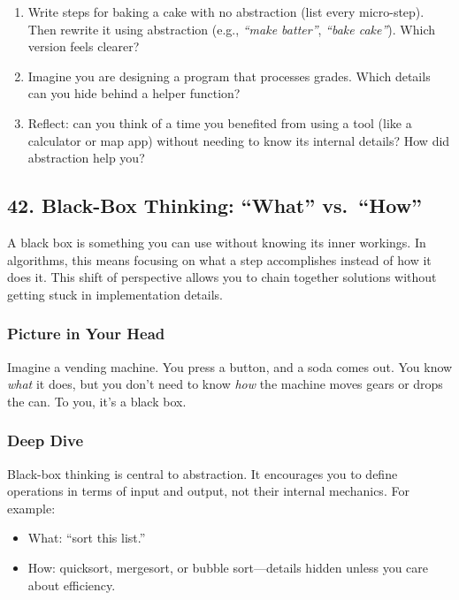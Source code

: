 \documentclass[
  letterpaper,
  DIV=11,
  numbers=noendperiod]{scrreprt}
\providecommand{\tightlist}{%
  \setlength{\itemsep}{0pt}\setlength{\parskip}{0pt}}
\begin{document}
\begin{enumerate}
\def\labelenumi{\arabic{enumi}.}
\tightlist
\item
  Write steps for baking a cake with no abstraction (list every
  micro-step). Then rewrite it using abstraction (e.g., \emph{``make
  batter''}, \emph{``bake cake''}). Which version feels clearer?
\item
  Imagine you are designing a program that processes grades. Which
  details can you hide behind a helper function?
\item
  Reflect: can you think of a time you benefited from using a tool (like
  a calculator or map app) without needing to know its internal details?
  How did abstraction help you?
\end{enumerate}

\subsection{42. Black-Box Thinking: ``What''
vs.~``How''}\label{black-box-thinking-what-vs.-how}

A black box is something you can use without knowing its inner workings.
In algorithms, this means focusing on what a step accomplishes instead
of how it does it. This shift of perspective allows you to chain
together solutions without getting stuck in implementation details.

\subsubsection{Picture in Your Head}\label{picture-in-your-head-41}

Imagine a vending machine. You press a button, and a soda comes out. You
know \emph{what} it does, but you don't need to know \emph{how} the
machine moves gears or drops the can. To you, it's a black box.

\subsubsection{Deep Dive}\label{deep-dive-11}

Black-box thinking is central to abstraction. It encourages you to
define operations in terms of input and output, not their internal
mechanics. For example:

\begin{itemize}
\tightlist
\item
  What: ``sort this list.''
\item
  How: quicksort, mergesort, or bubble sort---details hidden unless you
  care about efficiency.
\end{itemize}
\end{document}
